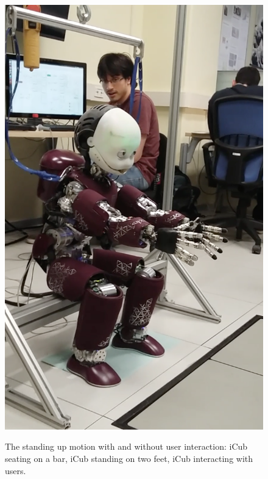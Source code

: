 \documentclass[12pt,a4paper,twoside]{article}
\begin{document}
\begin{figure}[!h][
\centering
\subfloat[]{
  \centering
  \includegraphics[width=.33\linewidth]{images/icubOnChair.png}
  \label{fig:sub1}
}
\caption{The standing up motion with and without user interaction: \protect{} iCub seating on a bar, \protect{} iCub standing on two feet, \protect{} iCub interacting with users.}
\label{fig:standingUp}

\end{figure}
\end{document}
